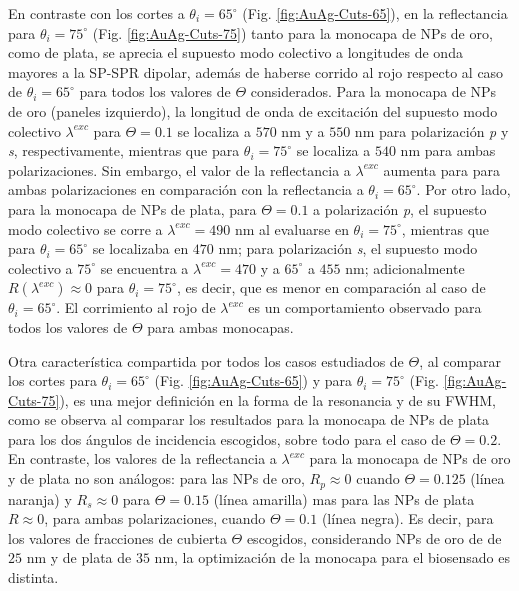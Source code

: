 En contraste con los cortes a $\theta_i=65^\circ$ (Fig. \ref{fig:AuAg-Cuts-65}), en la reflectancia para $\theta_i=75^\circ$ (Fig. \ref{fig:AuAg-Cuts-75}) tanto para la monocapa de NPs de oro, como de plata, se aprecia el supuesto modo colectivo a longitudes de onda mayores a la SP-SPR dipolar, además de haberse corrido al rojo respecto al caso de $\theta_i=65^\circ$ para todos los valores de $\Theta$ considerados. Para la monocapa de NPs de oro (paneles izquierdo), la longitud de onda de excitación del supuesto modo colectivo $\lambda^{exc}$ para $\Theta=0.1$ se localiza a $570$ nm y a $550$ nm para polarización \emph{p} y \emph{s}, respectivamente, mientras que para $\theta_i=75^\circ$ se localiza a $540$ nm para ambas polarizaciones. Sin embargo, el valor de la reflectancia a $\lambda^{exc}$ aumenta para para ambas polarizaciones en comparación con la reflectancia a $\theta_i=65^\circ$. Por otro lado, para la monocapa de NPs de plata, para $\Theta=0.1$ a polarización \emph{p}, el supuesto modo colectivo se corre a $\lambda^{exc}=490$ nm al evaluarse en $\theta_i=75^\circ$, mientras que para $\theta_i=65^\circ$ se localizaba en $470$ nm; para polarización \emph{s}, el supuesto modo colectivo a $75^\circ$ se encuentra a $\lambda^{exc}=470$ y a $65^\circ$ a $455$ nm; adicionalmente $R(\lambda^{exc})\approx 0$ para $\theta_i=75^\circ$, es decir, que es menor en comparación al caso de $\theta_i=65^\circ$. El corrimiento al rojo de $\lambda^{exc}$ es un comportamiento observado para todos los valores de $\Theta$ para ambas monocapas.

Otra característica compartida por todos los casos estudiados de $\Theta$, al comparar los cortes para $\theta_i=65^\circ$ (Fig. \ref{fig:AuAg-Cuts-65}) y para $\theta_i=75^\circ$ (Fig. \ref{fig:AuAg-Cuts-75}), es una mejor definición en la forma de la resonancia y de su FWHM, como se observa al comparar los resultados para la monocapa de NPs de plata para los dos ángulos de incidencia escogidos, sobre todo para el caso de $\Theta=0.2$. En contraste, los valores de la reflectancia a $\lambda^{exc}$ para la monocapa de NPs de oro y de plata no son análogos: para las NPs de oro, $R_p\approx 0$ cuando $\Theta=0.125$ (línea naranja) y $R_s\approx 0$ para $\Theta=0.15$ (línea amarilla) mas para las NPs de plata $R\approx 0$, para ambas polarizaciones, cuando $\Theta=0.1$ (línea negra). Es decir, para los valores de fracciones de cubierta $\Theta$ escogidos, considerando NPs de oro de de $25$ nm y de plata de $35$ nm, la optimización de la monocapa para el biosensado es distinta.

